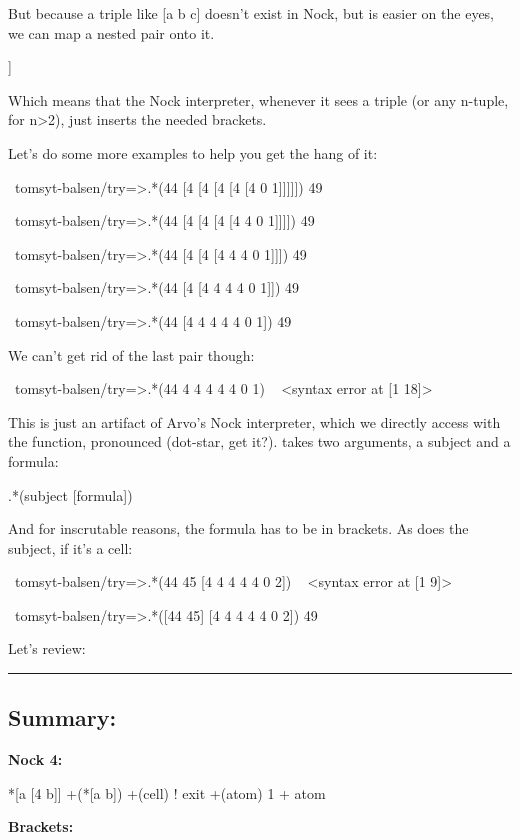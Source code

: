 But because a triple like [a b c] doesn't exist in Nock, but is easier on the
eyes, we can map a nested pair onto it.
\begin{code}
[a b c]         [a [b c]]
\end{code}
Which means that the Nock interpreter, whenever it sees a triple (or any
n-tuple, for n\textgreater{}2), just inserts the needed brackets.

Let's do some more examples to help you get the hang of it:
\begin{code}
~tomsyt-balsen/try=>.*(44 [4 [4 [4 [4 [4 0 1]]]]])
49

~tomsyt-balsen/try=>.*(44 [4 [4 [4 [4 4 0 1]]]])
49

~tomsyt-balsen/try=>.*(44 [4 [4 [4 4 4 0 1]]])
49

~tomsyt-balsen/try=>.*(44 [4 [4 4 4 4 0 1]])
49

~tomsyt-balsen/try=>.*(44 [4 4 4 4 4 0 1])
49
\end{code}

We can't get rid of the last pair though:

\begin{code}
~tomsyt-balsen/try=>.*(44 4 4 4 4 4 0 1)
~ <syntax error at [1 18]>
\end{code}

This is just an artifact of Arvo's Nock interpreter, which we directly access
with the  function, pronounced  (dot-star, get it?).  takes two
arguments, a subject and a formula:
\begin{code}
.*(subject [formula])
\end{code}
And for inscrutable reasons, the formula has to be in brackets. As does the
subject, if it's a cell:
\begin{code}
~tomsyt-balsen/try=>.*(44 45 [4 4 4 4 4 0 2])
~ <syntax error at [1 9]>

~tomsyt-balsen/try=>.*([44 45] [4 4 4 4 4 0 2])
49
\end{code}
Let's review:

\begin{center}
\rule{3in}{0.4pt}
\end{center}

\subsection{Summary:}

\textbf{Nock 4:}
\begin{code}
*[a [4 b]]         +(*[a b])
+(cell)            ! exit
+(atom)            1 + atom
\end{code}
\textbf{Brackets:}

